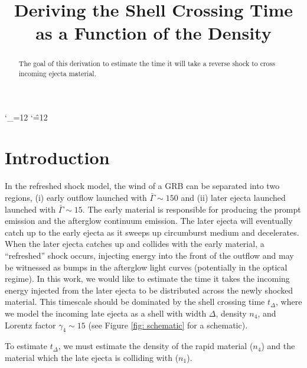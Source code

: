 \documentclass[linenumbers,twocolumn]{aastex631}
\def\upsubscripts{\catcode`\_=12 } \def\normalsubscripts{\catcode`\_=8 }
\def\upsupscripts{\catcode`\^=12 } \def\normalsupscripts{\catcode`\^=7 }
\begin{document}
\upsubscripts
\upsupscripts

\title{Deriving the Shell Crossing Time as a Function of the Density}


\begin{abstract}
The goal of this derivation to estimate the time it will take a reverse shock to cross incoming ejecta material.

\end{abstract}

\section{Introduction}
{
    In the refreshed shock model, the wind of a GRB can be separated into two regions, (i) early outflow launched with $\bar{\Gamma}\sim150$ and (ii) later ejecta launched launched with $\bar{\Gamma}\sim15$. The early material is responsible for producing the prompt emission and the afterglow continuum emission. The later ejecta will eventually catch up to the early ejecta as it sweeps up circumburst medium and decelerates. When the later ejecta catches up and collides with the early material, a ``refreshed'' shock occurs, injecting energy into the front of the outflow and may be witnessed as bumps in the afterglow light curves (potentially in the optical regime). In this work, we would like to estimate the time it takes the incoming energy injected from the later ejecta to be distributed across the newly shocked material. This timescale should be dominated by the shell crossing time $t_{\Delta }$, where we model the incoming late ejecta as a shell with width $\Delta$, density $n_4$, and Lorentz factor $\gamma_{4}\sim15$ (see Figure \ref{fig: schematic} for a schematic). 

    To estimate $t_{\Delta}$, we must estimate the density of the rapid material ($n_4$) and the material which the late ejecta is colliding with ($n_1$). 
}
\end{document}
